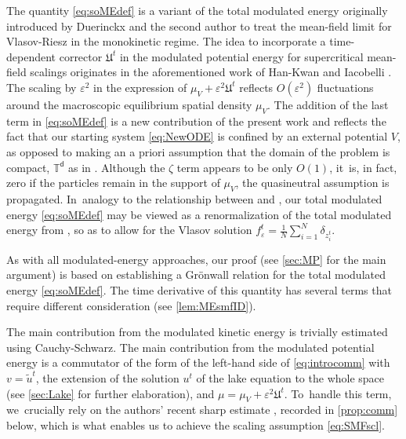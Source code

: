 \documentclass[10pt]{amsart}
\theoremstyle{plain}
\theoremstyle{definition}
\newcommand{\T}{{\mathbb{T}}}
\let\vep\varepsilon
\let\tl\tilde
\newcommand{\Uu}{\mathfrak{U}}
\renewcommand{\d}{\mathsf{d}}
\begin{document}
The quantity \eqref{eq:soMEdef} is a variant of the total modulated energy originally introduced by Duerinckx and the second author \cite[App.]{Serfaty2020} to treat the mean-field limit for Vlasov-Riesz in the monokinetic regime. The idea to incorporate a time-dependent corrector $\Uu^t$ in the modulated potential energy for supercritical mean-field scalings originates in the aforementioned work of Han-Kwan and Iacobelli \cite{HkI2021}. The scaling by $\vep^2$ in the expression of $\mu_V+\vep^2\Uu^t$ reflects $O(\vep^2)$ fluctuations around the macroscopic equilibrium spatial density $\mu_V$. The addition of the last term in \eqref{eq:soMEdef} is a new contribution of the present work and reflects the fact that our starting system \eqref{eq:NewODE} is confined by an external potential $V$, as opposed to making an a priori assumption that the domain of the problem is compact, \eg $\T^\d$ as in \cite{HkI2021, Rosenzweig2021ne}. Although the $\zeta$ term appears to be only $O(1)$, it~is, in fact, zero if the particles remain in the support of $\mu_V$, \ie the quasineutral assumption is propagated. In~analogy to the relationship between \cite{HkI2021} and \cite{Brenier2000}, our total modulated energy \eqref{eq:soMEdef} may be viewed as a renormalization of the total modulated energy from \cite{BCGM2015}, so as to allow for the Vlasov solution $f_\vep^t = \frac1N\sum_{i=1}^N \delta_{z_i^t}$.

As with all modulated-energy approaches, our proof (see \cref{sec:MP} for the main argument) is based on establishing a Grönwall relation for the total modulated energy \eqref{eq:soMEdef}. The time derivative of this quantity has several terms that require different consideration (see \cref{lem:MEsmfID}).

The main contribution from the modulated kinetic energy is trivially estimated using Cauchy-Schwarz. The main contribution from the modulated potential energy is a commutator of the form of the left-hand side of \eqref{eq:introcomm} with $v=\tl{u}^t$, the extension of the solution $u^t$ of the lake equation to the whole space (see \cref{sec:Lake} for further elaboration), and $\mu=\mu_V+\vep^2\Uu^t$. To~handle this term, we~crucially rely on the authors' recent sharp estimate \cite[Th.\,1.1]{RS2022}, recorded in \cref{prop:comm} below, which is what enables us to achieve the scaling assumption \eqref{eq:SMFscl}.
\end{document}
